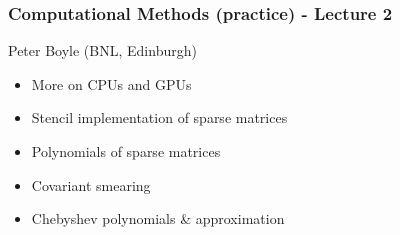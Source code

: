 \documentclass[pdf,ps,8pt]{beamer}
\begin{document}
\begin{frame}[fragile]\small\frametitle{  Computational Methods (practice) -  Lecture 2    }

  \begin{center}
 
  {\color{red} Peter Boyle} (BNL, Edinburgh)

  \begin{itemize}
  \item More on CPUs and GPUs
  \item Stencil implementation of sparse matrices 
  \item Polynomials of sparse matrices
  \item Covariant smearing
  \item Chebyshev polynomials \& approximation
  \end{itemize}

\end{center}  
\end{frame}
\end{document}

